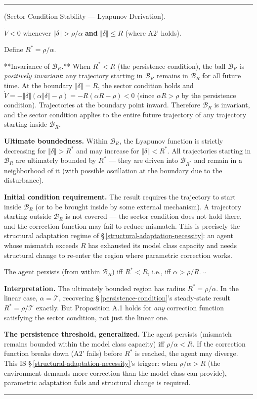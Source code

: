 \documentclass[11pt,oneside]{article}
\newcounter{claim}[section]
\renewcommand{\theclaim}{\thesection.\arabic{claim}}
\newenvironment{segment}[2]{%
  \refstepcounter{claim}%
  \bigskip\noindent\hrule\smallskip
  \noindent{\bfseries #1~\theclaim}\enskip(#2).\par\smallskip
  \noindent\ignorespaces
}{%
  \par\smallskip\noindent\hrule\bigskip
}
\newenvironment{derivation}[1][]{\begin{segment}{Derivation}{#1}}{\end{segment}}
\begin{document}
\begin{derivation}[Sector Condition Stability — Lyapunov Derivation]
$\dot{V} < 0$ whenever $\Vert\delta\Vert > \rho/\alpha$ \textbf{and} $\Vert\delta\Vert \leq R$ (where A2' holds).

Define $R^* = \rho/\alpha$.

**Invariance of $\mathcal B_R$.** When $R^* < R$ (the persistence condition), the ball $\mathcal B_R$ is \textit{positively invariant}: any trajectory starting in $\mathcal B_R$ remains in $\mathcal B_R$ for all future time. At the boundary $\Vert\delta\Vert = R$, the sector condition holds and $\dot{V} = -\Vert\delta\Vert(\alpha\Vert\delta\Vert - \rho) = -R(\alpha R - \rho) < 0$ (since $\alpha R > \rho$ by the persistence condition). Trajectories at the boundary point inward. Therefore $\mathcal B_R$ is invariant, and the sector condition applies to the entire future trajectory of any trajectory starting inside $\mathcal B_R$.

\textbf{Ultimate boundedness.} Within $\mathcal B_R$, the Lyapunov function is strictly decreasing for $\Vert\delta\Vert > R^*$ and may increase for $\Vert\delta\Vert < R^*$. All trajectories starting in $\mathcal B_R$ are ultimately bounded by $R^*$ — they are driven into $\mathcal B_{R^*}$ and remain in a neighborhood of it (with possible oscillation at the boundary due to the disturbance).

\textbf{Initial condition requirement.} The result requires the trajectory to start inside $\mathcal B_R$ (or to be brought inside by some external mechanism). A trajectory starting outside $\mathcal B_R$ is not covered — the sector condition does not hold there, and the correction function may fail to reduce mismatch. This is precisely the structural adaptation regime of \S\,\ref{structural-adaptation-necessity}: an agent whose mismatch exceeds $R$ has exhausted its model class capacity and needs structural change to re-enter the region where parametric correction works.

The agent persists (from within $\mathcal B_R$) iff $R^* < R$, i.e., iff $\alpha > \rho/R$. $\square$

\textbf{Interpretation.} The ultimately bounded region has radius $R^* = \rho/\alpha$. In the linear case, $\alpha = \mathcal{T}$, recovering \S\,\ref{persistence-condition}'s steady-state result $R^* = \rho/\mathcal{T}$ exactly. But Proposition A.1 holds for \textit{any} correction function satisfying the sector condition, not just the linear one.

\textbf{The persistence threshold, generalized.} The agent persists (mismatch remains bounded within the model class capacity) iff $\rho/\alpha < R$. If the correction function breaks down (A2' fails) before $R^*$ is reached, the agent may diverge. This IS \S\,\ref{structural-adaptation-necessity}'s trigger: when $\rho/\alpha > R$ (the environment demands more correction than the model class can provide), parametric adaptation fails and structural change is required.



\end{derivation}
\end{document}
